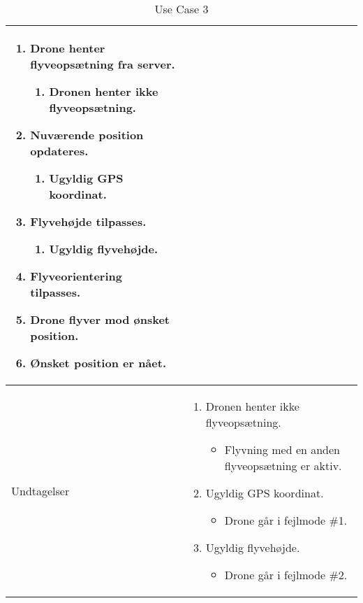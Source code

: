 \begin{table}[H]
\begin{tabular}{| p{3cm}| p{11.5cm}|}
									\begin{enumerate}[topsep=0.0cm, leftmargin=0.5cm]
										\item Drone henter flyveopsætning fra server.
											\begin{enumerate}[a:,partopsep=4cm, topsep=0cm, leftmargin=1cm]
												\item Dronen henter ikke flyveopsætning.
											\end{enumerate}
										\item Nuværende position opdateres.
											\begin{enumerate}[b:,partopsep=4cm, topsep=0cm, leftmargin=1cm]
												\item Ugyldig GPS koordinat.
											\end{enumerate}
										\item Flyvehøjde tilpasses.
											\begin{enumerate}[c:,partopsep=4cm, topsep=0cm, leftmargin=1cm]
												\item Ugyldig flyvehøjde.
											\end{enumerate}
										\item Flyveorientering tilpasses.
										\item Drone flyver mod ønsket position.
										\item Ønsket position er nået.
									\end{enumerate} \\\hline	

Undtagelser							& 

									\renewcommand{\labelenumi}{\Roman{enumi}:}
									\renewcommand{\labelenumii}{\alph{enumii})}
									\begin{enumerate}[a:,topsep=0.0cm,leftmargin=0.5cm]
										\item Dronen henter ikke flyveopsætning.
											\begin{itemize}[topsep=0cm, leftmargin=1cm]
												\item Flyvning med en anden flyveopsætning er aktiv.
											\end{itemize}
										\item Ugyldig GPS koordinat.
											\begin{itemize}[topsep=0cm, leftmargin=1cm]
												\item Drone går i fejlmode  \#1.
											\end{itemize}
										\item Ugyldig flyvehøjde.
											\begin{itemize}[topsep=0cm, leftmargin=1cm]
												\item Drone går i fejlmode \#2.
											\end{itemize}
									\end{enumerate} \\\hline	

\end{tabular}
\caption{Use Case 3}
\label{tab:UC3}
\end{table}